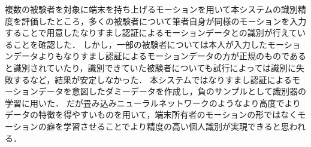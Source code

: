 複数の被験者を対象に端末を持ち上げるモーションを用いて本システムの識別精度を評価したところ，多くの被験者について筆者自身が同様のモーションを入力することで用意したなりすまし認証によるモーションデータとの識別が行えていることを確認した．
しかし，一部の被験者については本人が入力したモーションデータよりもなりすまし認証によるモーションデータの方が正規のものであると識別されていたり，識別できていた被験者についても試行によっては識別に失敗するなど，結果が安定しなかった．
本システムではなりすまし認証によるモーションデータを意図したダミーデータを作成し，負のサンプルとして識別器の学習に用いた．
だが畳み込みニューラルネットワークのようなより高度でよりデータの特徴を得やすいものを用いて，端末所有者のモーションの形ではなくモーションの癖を学習させることでより精度の高い個人識別が実現できると思われる．
